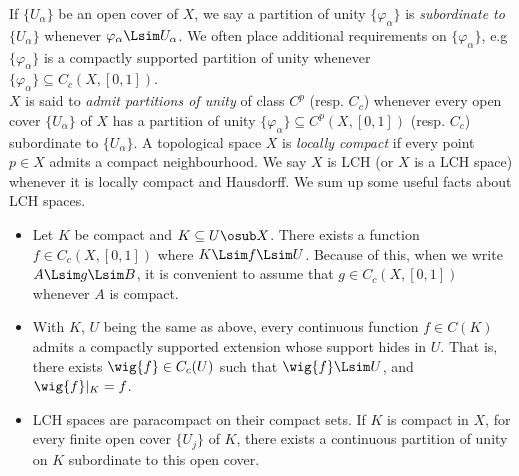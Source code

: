 \documentclass[../main-v2-manifolds.tex]{subfiles}
\begin{document}
If $\{U_{\alpha}\}$ be an open cover of $X$, we say a partition of unity $\{\varphi_\alpha\}$ is  \emph{subordinate to $\{U_\alpha\}$} whenever $\varphi_\alpha\Lsim U_\alpha$. We often place additional requirements on $\{\varphi_\alpha\}$, e.g $\{\varphi_\alpha\}$ is a compactly supported partition of unity whenever $\{\varphi_\alpha\}\subseteq C_c(X,[0,1])$.\\

$X$ is said to \emph{admit partitions of unity} of class $C^p$ (resp. $C_c$) whenever every open cover $\{U_\alpha\}$ of $X$ has a partition of unity $\{\varphi_\alpha\}\subseteq C^p(X,[0,1])$ (resp. $C_c$) subordinate to $\{U_\alpha\}$.
A topological space $X$ is \emph{locally compact} if every point $p\in X$ admits a compact neighbourhood. We say $X$ is LCH (or $X$ is a LCH space) whenever it is locally compact and Hausdorff. We sum up some useful facts about LCH spaces.
\begin{itemize}
    \item Let $K$ be compact and $K\subseteq U\osub X$. There exists a function $f\in C_c(X,[0,1])$ where $K\Lsim f\Lsim U$. Because of this, when we write $A\Lsim g\Lsim B$, it is convenient to assume that $g\in C_c(X,[0,1])$ whenever $A$ is compact.
    \item With $K$, $U$ being the same as above, every continuous function $f\in C(K)$ admits a compactly supported extension whose support hides in $U$. That is, there exists $\wig{f}\in C_c(U)$ such that $\wig{f}\Lsim U$, and $\wig{f}\vert_K = f$.
    \item LCH spaces are paracompact on their compact sets. If $K$ is compact in $X$, for every finite open cover $\{U_{j}\}$ of $K$, there exists a continuous partition of unity on $K$ subordinate to this open cover.
\end{itemize}
\end{document}
